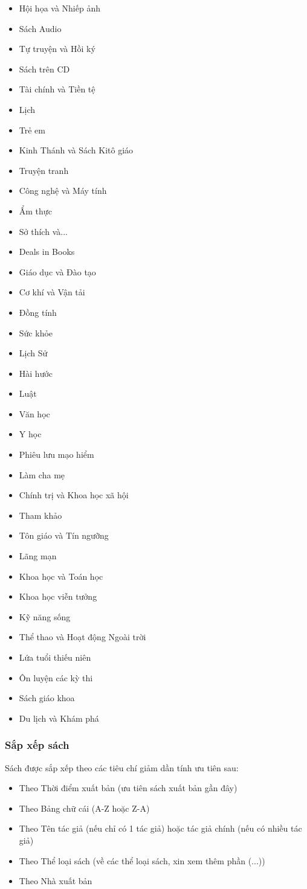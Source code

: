 \documentclass[12pt,a4paper]{report}
\begin{document}
			\begin{itemize}
				\item Hội họa và Nhiếp ảnh
				\item Sách Audio
				\item Tự truyện và Hồi ký
				\item Sách trên CD
				\item Tài chính và Tiền tệ
				\item Lịch
				\item Trẻ em
				\item Kinh Thánh và Sách Kitô giáo
				\item Truyện tranh
				\item Công nghệ và Máy tính
				\item Ẩm thực
				\item Sở thích và...
				\item Deals in Books
				\item Giáo dục và Đào tạo
				\item Cơ khí và Vận tải
				\item Đồng tính
				\item Sức khỏe
				\item Lịch Sử
				\item Hài hước
				\item Luật
				\item Văn học
				\item Y học
				\item Phiêu lưu mạo hiểm
				\item Làm cha mẹ
				\item Chính trị và Khoa học xã hội
				\item Tham khảo
				\item Tôn giáo và Tín ngưỡng
				\item Lãng mạn
				\item Khoa học và Toán học
				\item Khoa học viễn tưởng
				\item Kỹ năng sống
				\item Thể thao và Hoạt động Ngoài trời
				\item Lứa tuổi thiếu niên
				\item Ôn luyện các kỳ thi
				\item Sách giáo khoa
				\item Du lịch và Khám phá
			\end{itemize}
			\subsubsection{Sắp xếp sách}
			Sách được sắp xếp theo các tiêu chí giảm dần tính ưu tiên sau:
			\begin{itemize}
				\item Theo Thời điểm xuất bản (ưu tiên sách xuất bản gần đây)
				\item Theo Bảng chữ cái (A-Z hoặc Z-A)
				\item Theo Tên tác giả (nếu chỉ có 1 tác giả) hoặc tác giả chính (nếu có nhiều tác giả)
				\item Theo Thể loại sách (về các thể loại sách, xin xem thêm phần (...))
				\item Theo Nhà xuất bản
			\end{itemize}
\end{document}
